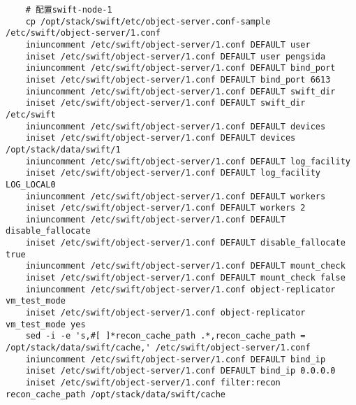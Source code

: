 \documentclass[a4paper,left=1.5cm,right=1.5cm,11pt]{article}
\begin{document}
\begin{lstlisting}
	# 配置swift-node-1
	cp /opt/stack/swift/etc/object-server.conf-sample /etc/swift/object-server/1.conf
	iniuncomment /etc/swift/object-server/1.conf DEFAULT user
    iniset /etc/swift/object-server/1.conf DEFAULT user pengsida
    iniuncomment /etc/swift/object-server/1.conf DEFAULT bind_port
    iniset /etc/swift/object-server/1.conf DEFAULT bind_port 6613
    iniuncomment /etc/swift/object-server/1.conf DEFAULT swift_dir
    iniset /etc/swift/object-server/1.conf DEFAULT swift_dir /etc/swift
    iniuncomment /etc/swift/object-server/1.conf DEFAULT devices
    iniset /etc/swift/object-server/1.conf DEFAULT devices /opt/stack/data/swift/1
    iniuncomment /etc/swift/object-server/1.conf DEFAULT log_facility
    iniset /etc/swift/object-server/1.conf DEFAULT log_facility LOG_LOCAL0
    iniuncomment /etc/swift/object-server/1.conf DEFAULT workers
    iniset /etc/swift/object-server/1.conf DEFAULT workers 2
    iniuncomment /etc/swift/object-server/1.conf DEFAULT disable_fallocate
    iniset /etc/swift/object-server/1.conf DEFAULT disable_fallocate true
    iniuncomment /etc/swift/object-server/1.conf DEFAULT mount_check
    iniset /etc/swift/object-server/1.conf DEFAULT mount_check false
    iniuncomment /etc/swift/object-server/1.conf object-replicator vm_test_mode
    iniset /etc/swift/object-server/1.conf object-replicator vm_test_mode yes
    sed -i -e 's,#[ ]*recon_cache_path .*,recon_cache_path = /opt/stack/data/swift/cache,' /etc/swift/object-server/1.conf
    iniuncomment /etc/swift/object-server/1.conf DEFAULT bind_ip
    iniset /etc/swift/object-server/1.conf DEFAULT bind_ip 0.0.0.0
    iniset /etc/swift/object-server/1.conf filter:recon recon_cache_path /opt/stack/data/swift/cache


\end{lstlisting}
\end{document}
